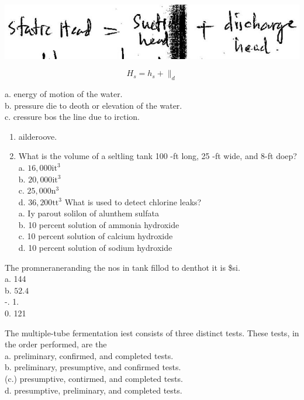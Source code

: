 \documentclass[10pt]{article}
\begin{document}
\includegraphics[max width=\textwidth]{2022_11_11_ca6a6c1a0324ee23e523g-18}

$$
H_{s}=h_{s}+\|_{d}
$$

a. energy of motion of the water.\\
b. pressure die to deoth or elevation of the water.\\
c. cressure bos the line due to irction.

\begin{enumerate}
  \item ailderoove.

  \item What is the volume of a seltling tank 100 -ft long, 25 -ft wide, and 8-ft doep?\\
a. $16,000 \mathrm{it}^{3}$\\
b. $20,000 \mathrm{it}^{3}$\\
c. $25,000 \mathrm{n}^{3}$\\
d. $36,200 \mathrm{tt}^{3}$ What is used to detect chlorine leaks?\\
a. Iy parout solilon of alunthem sulfata\\
b. 10 percent solution of ammonia hydroxide\\
c. 10 percent solution of calcium hydroxide\\
d. 10 percent solution of sodium hydroxide

\end{enumerate}

The promneraneranding the nos in tank fillod to denthot it is \$si.\\
a. 144\\
b. $52.4$\\
-. 1.\\
0. 121

The multiple-tube fermentation iest consists of three distinct tests. These tests, in the order performed, are the\\
a. preliminary, confirmed, and completed tests.\\
b. preliminary, presumptive, and confirmed tests.\\
(c.) presumptive, contirmed, and completed tests.\\
d. presumptive, preliminary, and completed tests.
\end{document}

